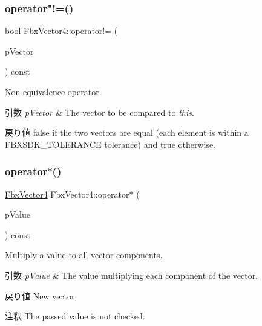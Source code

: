 \subsubsection{\texorpdfstring{operator"!=()}{operator!=()}}
{\footnotesize\ttfamily bool Fbx\+Vector4\+::operator!= (\begin{DoxyParamCaption}\item[{const \hyperlink{class_fbx_vector4}{Fbx\+Vector4} \&}]{p\+Vector }\end{DoxyParamCaption}) const}

Non equivalence operator. 
\begin{DoxyParams}{引数}
{\em p\+Vector} & The vector to be compared to {\itshape this}. \\
\hline
\end{DoxyParams}
\begin{DoxyReturn}{戻り値}
{\ttfamily false} if the two vectors are equal (each element is within a F\+B\+X\+S\+D\+K\+\_\+\+T\+O\+L\+E\+R\+A\+N\+CE tolerance) and {\ttfamily true} otherwise. 
\end{DoxyReturn}
\mbox{\label{class_fbx_vector4_aaa3324f6bdec531593e46004db16bdf8}} 
\subsubsection{\texorpdfstring{operator$\ast$()}{operator*()}\hspace{0.1cm}{\footnotesize\ttfamily [1/2]}}
{\footnotesize\ttfamily \hyperlink{class_fbx_vector4}{Fbx\+Vector4} Fbx\+Vector4\+::operator$\ast$ (\begin{DoxyParamCaption}\item[{double}]{p\+Value }\end{DoxyParamCaption}) const}

Multiply a value to all vector components. 
\begin{DoxyParams}{引数}
{\em p\+Value} & The value multiplying each component of the vector. \\
\hline
\end{DoxyParams}
\begin{DoxyReturn}{戻り値}
New vector. 
\end{DoxyReturn}
\begin{DoxyRemark}{注釈}
The passed value is not checked. 
\end{DoxyRemark}
\mbox{\label{class_fbx_vector4_ab125b0b39c89ef465e68502b66d20a2a}} 
